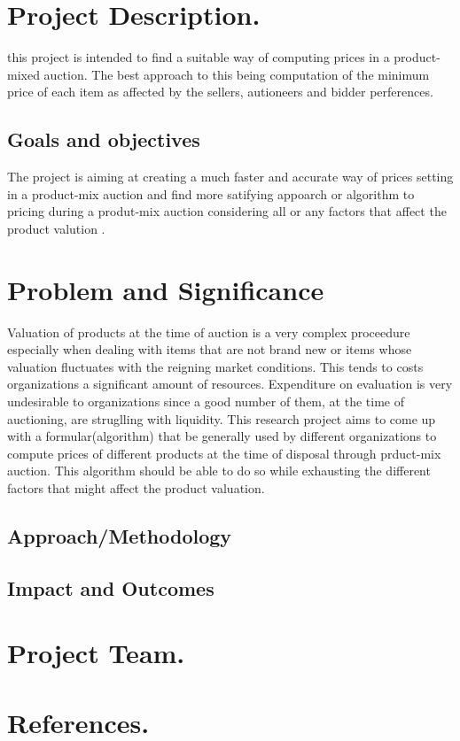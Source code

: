 \documentclass[11pt]{article} %
\begin{document}
\section{Project Description.}
this project is intended to find a  suitable way of computing prices in a product-mixed auction. The best approach to this being computation of the minimum price of each item as affected by the sellers, autioneers and bidder perferences.
 \subsection{Goals and objectives} 
 The project is aiming at creating a  much faster and accurate way of prices setting in a product-mix auction and find more satifying appoarch or algorithm to pricing during a produt-mix auction considering all or any factors that affect the product valution .

\section{Problem and Significance}
Valuation of products at the time of auction is a very complex proceedure especially when dealing with items that are not brand new or items whose valuation fluctuates with the reigning market conditions. This tends to costs organizations a significant amount of resources.
Expenditure on evaluation is very undesirable to organizations since a good number of them, at the time of auctioning, are struglling with liquidity.
This research project aims to come up with a formular(algorithm) that be generally used by different organizations to compute prices of different products at the time of disposal through prduct-mix auction. This algorithm should be able to do so while exhausting the different factors that might affect the product valuation.
\subsection{Approach/Methodology} 

\subsection{Impact and Outcomes}
\section{Project Team.}
\section{References.}
\end{document}
